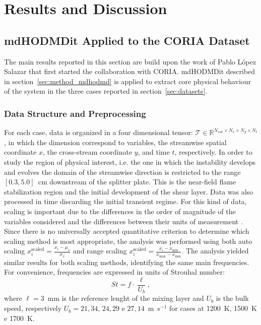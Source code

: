 \section{Results and Discussion}
\label{sec:results}

\subsection{mdHODMDit Applied to the CORIA Dataset} 
\label{sec:results_coria}

The main results reported in this section are build upon the work of Pablo López Salazar that first started the collaboration with CORIA. mdHODMDit described in section~\ref{sec:method_mdhodmd} is applied to extract core physical behaviour of the system in the three cases reported in section~\ref{sec:datasets}. 

\subsubsection{Data Structure and Preprocessing}
\label{sec:coria_preprocessing}

For each case, data is organized in a four dimensional tensor: $\mathcal{T} \in \mathbb{R}^{N_{\mathrm{var}} \times N_x \times N_y \times N_t}$, in which the dimension correspond to variables, the streamwise spatial coordinate $x$, the cross-stream coordinate $y$, and time $t$, respectively.
In order to study the region of physical interest, i.e. the one in which the instability develops and evolves the domain of the streamwise direction is restricted to the range $[0.3, 5.0]$~cm downstream of the splitter plate. This is the near-field flame stabilization region and the initial development of the shear layer. Data was also processed in time discarding the initial transient regime. 
For this kind of data, scaling is important due to the differences in the order of magnitude of the variables considered and the differences between their units of measurement \cite{corrochano2023higher, parente2013principal}. Since there is no universally accepted quantitative criterion to determine which scaling method is most appropriate, the analysis was performed using both auto scaling $x_{i}^{\text{scaled}} = \frac{x_i - \mu_x}{\sigma_x}$ and range scaling $x_{i}^{\text{scaled}} = \frac{x_i - x_{\min}}{x_{\max} - x_{\min}}$. The analysis yielded similar results for both scaling methods, identifying the same main frequencies.
For convenience, frequencies are expressed in units of Strouhal number: 
\begin{equation}
    St = f \cdot \frac{\ell}{U_b},
\label{eq:strouhal}
\end{equation}
where $\ell = 3$~mm is the reference lenght of the mixing layer and  $U_b$ is the bulk speed, respectively $U_b = 21{,}34$, $24{,}29$ e $27{,}14$~m~s$^{-1}$ for cases at 1200~K, 1500~K e 1700~K.

